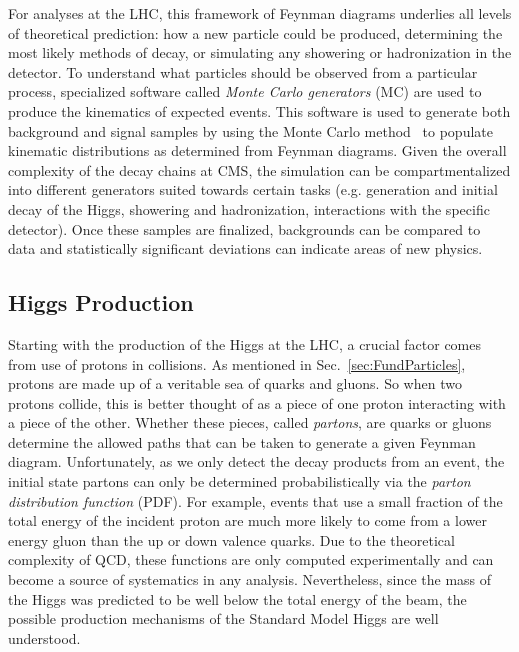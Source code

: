 For analyses at the LHC, this framework of Feynman diagrams underlies all levels of theoretical prediction: how a new particle could be produced, determining the most likely methods of decay, or simulating any showering or hadronization in the detector. To understand what particles should be observed from a particular process, specialized software called \textit{Monte Carlo generators} (MC) are used to produce the kinematics of expected events. This software is used to generate both background and signal samples by using the Monte Carlo method~\cite{MonteCarloMethod:1949} to populate kinematic distributions as determined from Feynman diagrams. Given the overall complexity of the decay chains at CMS, the simulation can be compartmentalized into different generators suited towards certain tasks (e.g. generation and initial decay of the Higgs, showering and hadronization, interactions with the specific detector). Once these samples are finalized, backgrounds can be compared to data and statistically significant deviations can indicate areas of new physics.

\subsection{Higgs Production}
\label{sec:HiggsProduction}

Starting with the production of the Higgs at the LHC, a crucial factor comes from use of protons in collisions. As mentioned in Sec.~\ref{sec:FundParticles}, protons are made up of a veritable sea of quarks and gluons. So when two protons collide, this is better thought of as a piece of one proton interacting with a piece of the other. Whether these pieces, called \textit{partons}, are quarks or gluons determine the allowed paths that can be taken to generate a given Feynman diagram. Unfortunately, as we only detect the decay products from an event, the initial state partons can only be determined probabilistically via the \textit{parton distribution function} (PDF). For example, events that use a small fraction of the total energy of the incident proton are much more likely to come from a lower energy gluon than the up or down valence quarks. Due to the theoretical complexity of QCD, these functions are only computed experimentally and can become a source of systematics in any analysis. Nevertheless, since the mass of the Higgs was predicted to be well below the total energy of the beam, the possible production mechanisms of the Standard Model Higgs are well understood.

